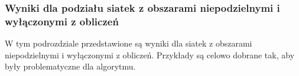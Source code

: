 \newpage

\subsubsection{Wyniki dla podziału siatek z obszarami niepodzielnymi i wyłączonymi z obliczeń}
W tym podrozdziale przedstawione są wyniki dla siatek z obszarami niepodzielnymi i wyłączonymi
z obliczeń.
Przykłady są celowo dobrane tak, aby były problematyczne dla algorytmu.

\begin{figure}[h]
\centering
\begin{subfigure}{.33\textwidth}
    \centering
    \caption[short]{}
\end{subfigure}%
\begin{subfigure}{.33\textwidth}
    \centering
    \caption[short]{}
\end{subfigure}%

\end{figure}
